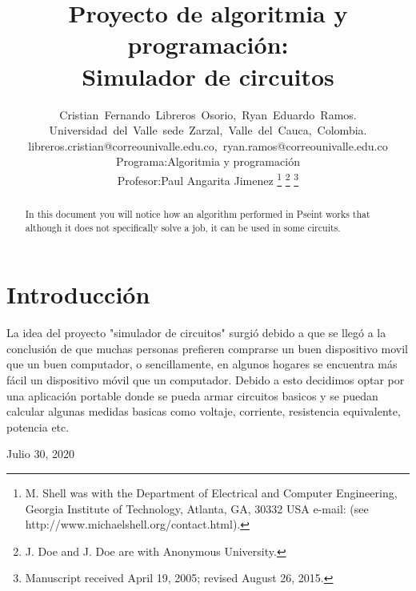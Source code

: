 \documentclass[journal]{IEEEtran}
\begin{document}
\title{Proyecto de algoritmia y programación:\\
Simulador de circuitos}


\author{Cristian~Fernando~Libreros~Osorio,~Ryan~Eduardo~Ramos.\\Universidad~del~Valle~sede~Zarzal,~Valle~del~Cauca,~Colombia.\\libreros.cristian@correounivalle.edu.co,~ryan.ramos@correounivalle.edu.co\\Programa:Algoritmia y programación\\Profesor:Paul Angarita Jimenez
\thanks{M. Shell was with the Department
of Electrical and Computer Engineering, Georgia Institute of Technology, Atlanta,
GA, 30332 USA e-mail: (see http://www.michaelshell.org/contact.html).}
\thanks{J. Doe and J. Doe are with Anonymous University.}
\thanks{Manuscript received April 19, 2005; revised August 26, 2015.}}


\maketitle


\begin{abstract}
In this document you will notice how an algorithm performed in Pseint works that although it does not specifically solve a job, it can be used in some circuits.
\end{abstract}








\IEEEpeerreviewmaketitle



\section{Introducción}
La idea del proyecto "simulador de circuitos" surgió debido a que se llegó a la conclusión de que muchas personas prefieren comprarse un buen dispositivo movil que un buen computador, o sencillamente, en algunos hogares se encuentra más fácil un dispositivo móvil que un computador. Debido a esto decidimos optar por una aplicación portable donde se pueda armar circuitos basicos y se puedan calcular algunas medidas basicas como voltaje, corriente, resistencia equivalente, potencia etc.

\IEEEPARstart{}{}




 
\hfill Julio 30, 2020
\end{document}
